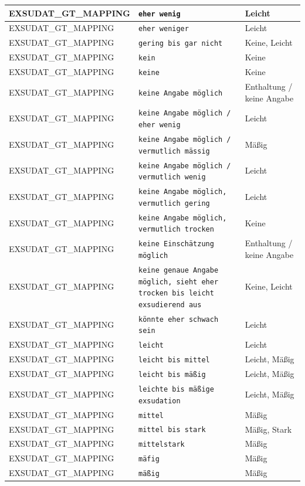 \begin{longtable}{|p{3.5cm}|p{5cm}|p{6.5cm}|}
EXSUDAT\_GT\_MAPPING & \texttt{eher wenig} & Leicht \\ \hline
EXSUDAT\_GT\_MAPPING & \texttt{eher weniger} & Leicht \\ \hline
EXSUDAT\_GT\_MAPPING & \texttt{gering bis gar nicht} & Keine, Leicht \\ \hline
EXSUDAT\_GT\_MAPPING & \texttt{kein} & Keine \\ \hline
EXSUDAT\_GT\_MAPPING & \texttt{keine} & Keine \\ \hline
EXSUDAT\_GT\_MAPPING & \texttt{keine Angabe möglich} & Enthaltung / keine Angabe \\ \hline
EXSUDAT\_GT\_MAPPING & \texttt{keine Angabe möglich / eher wenig} & Leicht \\ \hline
EXSUDAT\_GT\_MAPPING & \texttt{keine Angabe möglich / vermutlich mässig} & Mäßig \\ \hline
EXSUDAT\_GT\_MAPPING & \texttt{keine Angabe möglich / vermutlich wenig} & Leicht \\ \hline
EXSUDAT\_GT\_MAPPING & \texttt{keine Angabe möglich, vermutlich gering} & Leicht \\ \hline
EXSUDAT\_GT\_MAPPING & \texttt{keine Angabe möglich, vermutlich trocken} & Keine \\ \hline
EXSUDAT\_GT\_MAPPING & \texttt{keine Einschätzung möglich} & Enthaltung / keine Angabe \\ \hline
EXSUDAT\_GT\_MAPPING & \texttt{keine genaue Angabe möglich, sieht eher trocken bis leicht exsudierend aus} & Keine, Leicht \\ \hline
EXSUDAT\_GT\_MAPPING & \texttt{könnte eher schwach sein} & Leicht \\ \hline
EXSUDAT\_GT\_MAPPING & \texttt{leicht} & Leicht \\ \hline
EXSUDAT\_GT\_MAPPING & \texttt{leicht bis mittel} & Leicht, Mäßig \\ \hline
EXSUDAT\_GT\_MAPPING & \texttt{leicht bis mäßig} & Leicht, Mäßig \\ \hline
EXSUDAT\_GT\_MAPPING & \texttt{leichte bis mäßige exsudation} & Leicht, Mäßig \\ \hline
EXSUDAT\_GT\_MAPPING & \texttt{mittel} & Mäßig \\ \hline
EXSUDAT\_GT\_MAPPING & \texttt{mittel bis stark} & Mäßig, Stark \\ \hline
EXSUDAT\_GT\_MAPPING & \texttt{mittelstark} & Mäßig \\ \hline
EXSUDAT\_GT\_MAPPING & \texttt{mäfig} & Mäßig \\ \hline
EXSUDAT\_GT\_MAPPING & \texttt{mäßig} & Mäßig \\ \hline

\end{longtable}
